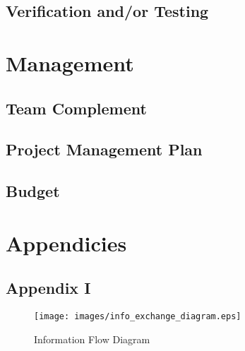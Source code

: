 \documentclass[12pt,letterpaper]{article}
\begin{document}
\subsection{Verification and/or Testing}

\section{Management}
\subsection{Team Complement}

\subsection{Project Management Plan}

\subsection{Budget}

\newpage

\section{Appendicies}
\subsection{Appendix I}
\begin{figure}[!ht]
\centering
\texttt{[image: images/info\_exchange\_diagram.eps]}
\caption{Information Flow Diagram}
\label{fig: image}
\end{figure}
\end{document}
